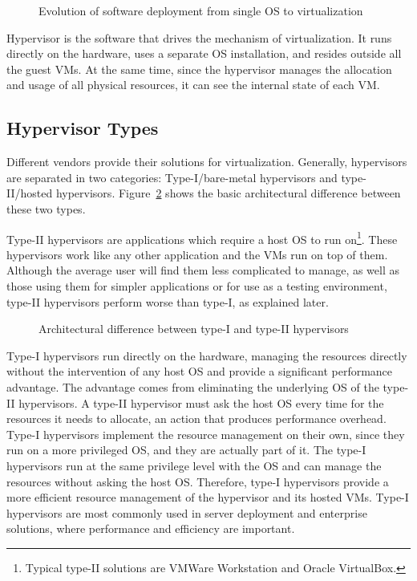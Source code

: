\begin{figure}
	\centering
	
	\caption{Evolution of software deployment from single \ac{OS} to virtualization}
	\label{fig:tovirt}
\end{figure}

Hypervisor is the software that drives the mechanism of virtualization. It runs directly on the hardware, uses a separate \ac{OS} installation, and resides outside all the guest \ac{VM}s. At the same time, since the hypervisor manages the allocation and usage of all physical resources, it can see the internal state of each \ac{VM}. 

\subsection{Hypervisor Types}\label{sub:hyptypes}
Different vendors provide their solutions for virtualization. Generally, hypervisors are separated in two categories: Type-I/bare-metal hypervisors and type-II/hosted hypervisors. Figure~\ref{fig:hyptypes} shows the basic architectural difference between these two types.

\par Type-II hypervisors are applications which require a host \ac{OS} to run on\footnote{Typical type-II solutions are VMWare Workstation and Oracle VirtualBox.}. These hypervisors work like any other application and the \acp{VM} run on top of them. Although the average user will find them less complicated to manage, as well as those using them for simpler applications or for use as a testing environment, type-II hypervisors perform worse than type-I, as explained later. 

\begin{figure}
	\centering
	
	\caption{Architectural difference between type-I and type-II hypervisors}
	\label{fig:hyptypes}
\end{figure}

\par Type-I hypervisors run directly on the hardware, managing the resources directly without the intervention of any host \ac{OS} and provide a significant performance advantage. The advantage comes from eliminating the underlying \ac{OS} of the type-II hypervisors. A type-II hypervisor must ask the host \ac{OS} every time for the resources it needs to allocate, an action that produces performance overhead. Type-I hypervisors implement the resource management on their own, since they run on a more privileged \ac{OS}, and they are actually part of it. The type-I hypervisors run at the same privilege level with the \ac{OS} and can manage the resources without asking the host \ac{OS}. Therefore, type-I hypervisors provide a more efficient resource management of the hypervisor and its hosted \acp{VM}. Type-I hypervisors are most commonly used in server deployment and enterprise solutions, where performance and efficiency are important. 

